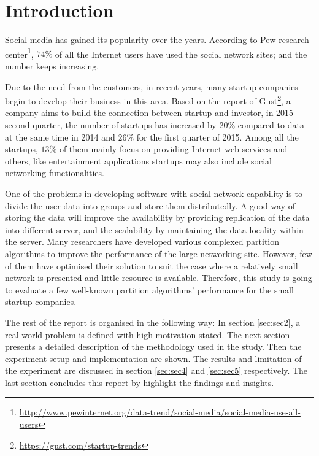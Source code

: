 \section{Introduction}

Social media has gained its popularity over the years. According to Pew research center\footnote{\url{http://www.pewinternet.org/data-trend/social-media/social-media-use-all-users}}, $74\%$ of all the Internet users have used the social network sites; and the number keeps increasing. 

Due to the need from the customers, in recent years, many startup companies begin to develop their business in this area. Based on the report of Gust\footnote{\url{https://gust.com/startup-trends}}, a company aims to build the connection between startup and investor, in 2015 second quarter, the number of startups has increased by $20\%$ compared to data at the same time in 2014 and $26\%$ for the first quarter of 2015. Among all the startups, $13\%$ of them mainly focus on providing Internet web services and others, like entertainment applications startups may also include social networking functionalities. 

One of the problems in developing software with social network capability is to divide the user data into groups and store them distributedly. A good way of storing the data will improve the availability by providing replication of the data into different server, and the scalability by maintaining the data locality within the server. Many researchers have developed various complexed partition algorithms to improve the performance of the large networking site. However, few of them have optimised their solution to suit the case where a relatively small network is presented and little resource is available. Therefore, this study is going to evaluate a few well-known partition algorithms' performance for the small startup companies.

\bigskip

The rest of the report is organised in the following way: In section \ref{sec:sec2}, a real world problem is defined with high motivation stated. The next section presents a detailed description of the methodology used in the study. Then the experiment setup and implementation are shown. The results and limitation of the experiment are discussed in section \ref{sec:sec4} and \ref{sec:sec5} respectively. The last section concludes this report by highlight the findings and insights.